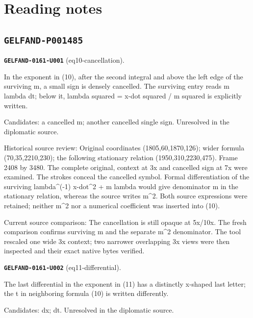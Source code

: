 \section*{Reading notes}
\subsection*{\texttt{GELFAND-P001485}}
\par\noindent\leavevmode{}\label{GELFAND-0161-U001}\label{GELFAND-P001485:eq10-cancellation}\textbf{\texttt{GELFAND-0161-U001}} (eq10-cancellation).\nopagebreak[4]\par
In the exponent in (10), after the second integral and above the left edge of the surviving m, a small sign is densely cancelled. The surviving entry reads m lambda dt; below it, lambda squared = x-dot squared / m squared is explicitly written.\par
Candidates: a cancelled m; another cancelled single sign. Unresolved in the diplomatic source.\par
Historical source review: Original coordinates (1805,60,1870,126); wider formula (70,35,2210,230); the following stationary relation (1950,310,2230,475). Frame 2408 by 3480. The complete original, context at 3x and cancelled sign at 7x were examined. The strokes conceal the cancelled symbol. Formal differentiation of the surviving lambda\textasciicircum{}(-1) x-dot\textasciicircum{}2 + m lambda would give denominator m in the stationary relation, whereas the source writes m\textasciicircum{}2. Both source expressions were retained; neither m\textasciicircum{}2 nor a numerical coefficient was inserted into (10).\par
Current source comparison: The cancellation is still opaque at 5x/10x. The fresh comparison confirms surviving m and the separate m\textasciicircum{}2 denominator. The tool rescaled one wide 3x context; two narrower overlapping 3x views were then inspected and their exact native bytes verified.\par\medskip
\par\noindent\leavevmode{}\label{GELFAND-0161-U002}\label{GELFAND-P001485:eq11-differential}\textbf{\texttt{GELFAND-0161-U002}} (eq11-differential).\nopagebreak[4]\par
The last differential in the exponent in (11) has a distinctly x-shaped last letter; the t in neighboring formula (10) is written differently.\par
Candidates: dx; dt. Unresolved in the diplomatic source.\par
